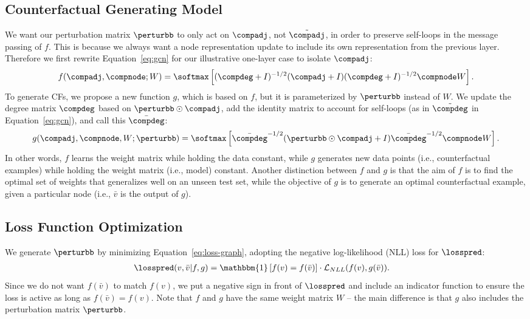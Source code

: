 \pagebreak


\subsection{Counterfactual Generating Model}
We want our perturbation matrix $\perturbb$ to only act on $\compadj$, not $\tilde{\compadj}$, in order to preserve self-loops in the message passing of $f$. This is because we always want a node representation update to include its own representation from the previous layer. 
Therefore we first rewrite Equation~\ref{eq:gcn} for our illustrative one-layer case to isolate $\compadj$: 
%
\begin{align}
f(\compadj, \compnode; W) = \softmax\left[(\compdeg + I)^{-1/2} (\compadj + I) (\compdeg + I)^{-1/2} \compnode W\right].
    \label{eq:gcn3}
\end{align}
%
To generate CFs, we propose a new function $g$, which is based on $f$, but it is parameterized by $\perturbb$ instead of $W$. 
We update the degree matrix $\compdeg$ based on $\perturbb \odot \compadj$, add the identity matrix to account for self-loops (as in $\tilde{\compdeg}$ in Equation~\ref{eq:gcn}), and call this $\bar{\compdeg}$: 
%
\begin{align}
    \label{eq:cf}
    g(\compadj, \compnode, W; \perturbb) = \softmax\left[\bar{\compdeg}^{-1/2} (\perturbb \odot \compadj + I) \bar{\compdeg}^{-1/2} \compnode W\right].
\end{align}
%
In other words, $f$ learns the weight matrix while holding the data constant, while $g$ 
generates new data points (i.e., counterfactual examples) while holding the weight matrix (i.e., model) constant. 
Another distinction between $f$ and $g$ is that the aim of $f$ is to find the optimal set of weights that generalizes well on an unseen test set, while the objective of $g$ is to generate an optimal counterfactual example, given a particular node (i.e., $\bar{v}$ is the output of $g$). 


\subsection{Loss Function Optimization}
We generate $\perturbb$ by minimizing Equation~\ref{eq:loss-graph}, adopting the negative log-likelihood (NLL) loss  for $\losspred$:
\begin{align}
    &\losspred(v, \bar{v}|f, g) =\mathbbm{1}\left[f(v) = f(\bar{v})\right] \cdot \mathcal{L}_{NLL}(f(v), g(\bar{v})).
    \label{eq:loss-pred}
\end{align}
Since we do not want $f(\bar{v})$ to match $f(v)$, we put a negative sign in front of $\losspred$ and include an indicator function to ensure the loss is active as long as $f(\bar{v}) = f(v)$. 
Note that $f$ and $g$ have the same weight matrix $W$ -- the main difference is that $g$ also includes the perturbation matrix $\perturbb$. 


